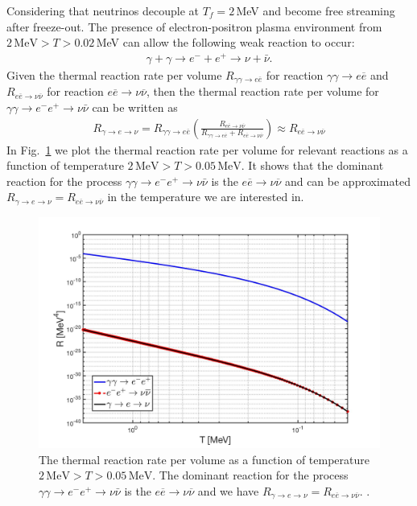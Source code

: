 Considering that neutrinos decouple at $T_f=2$\,MeV and become free streaming after freeze-out. The presence of electron-positron plasma environment from $2\,\mathrm{MeV}>T>0.02$\,MeV can allow the following weak reaction to occur:
\begin{align}
\gamma+\gamma\longrightarrow e^-+e^+\longrightarrow \nu+\bar{\nu}.
\end{align}
Given the  thermal reaction rate per volume $R_{\gamma\gamma\to e\overline{e}}$ for reaction $\gamma\gamma\to e\overline{e}$ and $R_{e\overline{e}\to\nu\overline{\nu}}$ for reaction $e\overline{e}\to\nu\overline{\nu}$, then the thermal reaction rate per volume for $\gamma\gamma\to e^-e^+\to\nu\bar{\nu}$ can be written as
\begin{align}
R_{\gamma\to e\to\nu}=R_{\gamma\gamma\to e\overline{e}}\left(\frac{R_{e\overline{e}\to\nu\overline{\nu}}}{R_{\gamma\gamma\to e\overline{e}}+R_{e\overline{e}\to\nu\overline{\nu}}}\right)\approx R_{e\overline{e}\to\nu\overline{\nu}}
\end{align}
In Fig.~\ref{ExtraNeutrinoRate} we plot the thermal reaction rate per volume for relevant reactions as a function of temperature $2\,\mathrm{MeV}>T>0.05\,\mathrm{MeV}$. It shows that the dominant reaction for the process $\gamma\gamma\to e^-e^+\to\nu\bar{\nu}$ is the $e\overline{e}\to\nu\overline{\nu}$ and can be approximated $R_{\gamma\to e\to\nu}=R_{e\overline{e}\to\nu\overline{\nu}}$ in the temperature we are interested in.
\begin{figure}[ht]
\begin{center}
\includegraphics[width=0.9\linewidth]{./plots/Extra_neutrino_rate_volume}
\caption{The thermal reaction rate per volume as a function of temperature $2\,\mathrm{MeV}>T>0.05\,\mathrm{MeV}$. The dominant reaction for the process $\gamma\gamma\to e^-e^+\to\nu\bar{\nu}$ is the $e\overline{e}\to\nu\overline{\nu}$ and we have $R_{\gamma\to e\to\nu}=R_{e\overline{e}\to\nu\overline{\nu}}$. .}
\label{ExtraNeutrinoRate}
\end{center}
\end{figure}


